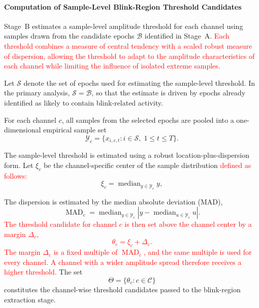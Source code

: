 \documentclass[journal,twoside,web]{ieeecolor}
\newcommand{\rev}[1]{\textcolor{red}{#1}}
\begin{document}
\paragraph{Computation of Sample-Level Blink-Region Threshold Candidates}


Stage~B estimates a sample-level amplitude threshold for each channel using samples drawn from the candidate epochs $\mathcal{B}$ identified in Stage~A.
%
\rev{Each threshold combines a measure of central tendency with a scaled robust measure of dispersion, allowing the threshold to adapt to the amplitude characteristics of each channel while limiting the influence of isolated extreme samples.
%
}


Let \(\mathcal{S}\) denote the set of epochs used for estimating the
sample-level threshold. In the primary analysis,
\(\mathcal{S}=\mathcal{B}\), so that the estimate is driven by epochs already
identified as likely to contain blink-related activity.


For each channel \(c\), all samples from the selected epochs are pooled into a
one-dimensional empirical sample set
\begin{equation}
\mathcal{Y}_c
= \{x_{i,c,t}: i \in \mathcal{S},\; 1 \leq t \leq T\}.
\end{equation}
%
%
%

The sample-level threshold is estimated using a robust location-plus-dispersion form. Let \(\xi_c\) be the channel-specific center of the sample distribution %
\rev{defined as follows:}
\begin{equation}
\xi_c = \operatorname{median}_{y \in \mathcal{Y}_c} y,
\end{equation}

%
%
%
The dispersion is estimated by the median absolute
deviation (MAD),
\begin{equation}
\operatorname{MAD}_c
= \operatorname{median}_{y \in \mathcal{Y}_c}
\left|y-\operatorname{median}_{u \in \mathcal{Y}_c}u\right|.
\end{equation}
%
%
%
%
%
\rev{The threshold candidate for channel \(c\) is then set above the channel center by a margin \(\Delta_c\),
\begin{equation}
\theta_c = \xi_c + \Delta_c .
\end{equation}
The margin \(\Delta_c\) is a fixed multiple of \(\operatorname{MAD}_c\), and the same multiple is used for every channel. A channel with a wider amplitude spread therefore receives a higher threshold.}
The set
\begin{equation}
\Theta = \{\theta_c: c \in \mathcal{C}\}
\end{equation}
constitutes the channel-wise threshold candidates passed to the blink-region extraction stage.
\end{document}
